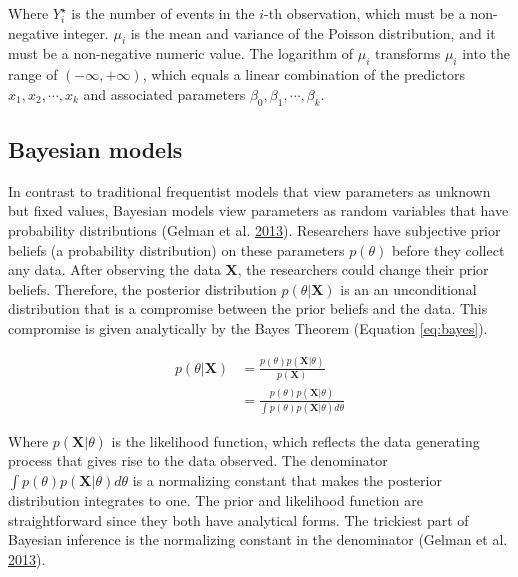 \documentclass[12pt]{book}
\numberwithin{equation}{chapter}
\begin{document}
Where \(Y_i^\star\) is the number of events in the \(i\)-th observation, which must be a non-negative integer. \(\mu_i\) is the mean and variance of the Poisson distribution, and it must be a non-negative numeric value. The logarithm of \(\mu_i\) transforms \(\mu_i\) into the range of \((-\infty, +\infty)\), which equals a linear combination of the predictors \(x_1, x_2, \cdots, x_k\) and associated parameters \(\beta_0, \beta_1, \cdots, \beta_k\).

\hypertarget{bayesian-models}{%
\subsection{Bayesian models}\label{bayesian-models}}

In contrast to traditional frequentist models that view parameters as unknown but fixed values, Bayesian models view parameters as random variables that have probability distributions (Gelman et al. \protect\hyperlink{ref-gelman2013bayesian}{2013}). Researchers have subjective prior beliefs (a probability distribution) on these parameters \(p(\theta)\) before they collect any data. After observing the data \(\mathbf{X}\), the researchers could change their prior beliefs. Therefore, the posterior distribution \(p(\theta | \mathbf{X})\) is an an unconditional distribution that is a compromise between the prior beliefs and the data. This compromise is given analytically by the Bayes Theorem (Equation \eqref{eq:bayes}).

\begin{equation}
\begin{split}
p(\theta | \mathbf{X}) & = \frac{p(\theta)p(\mathbf{X}|\theta)}{p(\mathbf{X})} \\
 & = \frac{p(\theta)p(\mathbf{X}|\theta )}{\int p(\theta)p(\mathbf{X}|\theta)d\theta}
\label{eq:bayes}
\end{split}
\end{equation}

Where \(p(\mathbf{X}|\theta)\) is the likelihood function, which reflects the data generating process that gives rise to the data observed. The denominator \(\int p(\theta)p(\mathbf{X}|\theta)d\theta\) is a normalizing constant that makes the posterior distribution integrates to one. The prior and likelihood function are straightforward since they both have analytical forms. The trickiest part of Bayesian inference is the normalizing constant in the denominator (Gelman et al. \protect\hyperlink{ref-gelman2013bayesian}{2013}).
\end{document}
